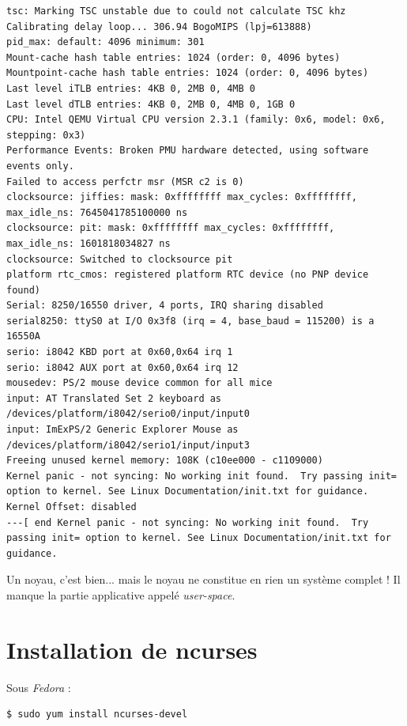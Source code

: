 \documentclass[a4paper]{article}
\begin{document}
\begin{verbatim}
tsc: Marking TSC unstable due to could not calculate TSC khz
Calibrating delay loop... 306.94 BogoMIPS (lpj=613888)
pid_max: default: 4096 minimum: 301
Mount-cache hash table entries: 1024 (order: 0, 4096 bytes)
Mountpoint-cache hash table entries: 1024 (order: 0, 4096 bytes)
Last level iTLB entries: 4KB 0, 2MB 0, 4MB 0
Last level dTLB entries: 4KB 0, 2MB 0, 4MB 0, 1GB 0
CPU: Intel QEMU Virtual CPU version 2.3.1 (family: 0x6, model: 0x6, stepping: 0x3)
Performance Events: Broken PMU hardware detected, using software events only.
Failed to access perfctr msr (MSR c2 is 0)
clocksource: jiffies: mask: 0xffffffff max_cycles: 0xffffffff, max_idle_ns: 7645041785100000 ns
clocksource: pit: mask: 0xffffffff max_cycles: 0xffffffff, max_idle_ns: 1601818034827 ns
clocksource: Switched to clocksource pit
platform rtc_cmos: registered platform RTC device (no PNP device found)
Serial: 8250/16550 driver, 4 ports, IRQ sharing disabled
serial8250: ttyS0 at I/O 0x3f8 (irq = 4, base_baud = 115200) is a 16550A
serio: i8042 KBD port at 0x60,0x64 irq 1
serio: i8042 AUX port at 0x60,0x64 irq 12
mousedev: PS/2 mouse device common for all mice
input: AT Translated Set 2 keyboard as /devices/platform/i8042/serio0/input/input0
input: ImExPS/2 Generic Explorer Mouse as /devices/platform/i8042/serio1/input/input3
Freeing unused kernel memory: 108K (c10ee000 - c1109000)
Kernel panic - not syncing: No working init found.  Try passing init= option to kernel. See Linux Documentation/init.txt for guidance.
Kernel Offset: disabled
---[ end Kernel panic - not syncing: No working init found.  Try passing init= option to kernel. See Linux Documentation/init.txt for guidance.
\end{verbatim}

Un noyau, c'est bien... mais le noyau ne constitue en rien un système complet ! Il manque la partie applicative appelé \textit{user-space}.

\clearpage
\appendix

\section{Installation de ncurses}

Sous \textit{Fedora} :
\begin{verbatim}
$ sudo yum install ncurses-devel
\end{verbatim}

\clearpage
\listoffigures
\end{document}

